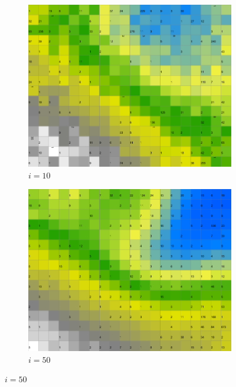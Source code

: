 \documentclass{acm_proc_article-sp}
\begin{document}
\begin{figure}
\centering
    \centering
    \begin{subfigure}[b]{0.24\linewidth}
        \includegraphics[width=\linewidth]{img/wine-newmid-activity-histogram-i-10}
        \caption{$i=10$}
        \label{fig:wine-newmid-activity-histogram-i-10}
    \end{subfigure}
    \begin{subfigure}[b]{0.24\linewidth}
        \includegraphics[width=\linewidth]{img/wine-newmid-activity-histogram-i-50}
        \caption{$i=50$}
        \label{fig:wine-newmid-activity-histogram-i-50}

\end{subfigure}
\end{figure}
\end{document}
